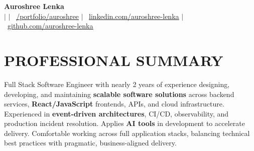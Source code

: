 \documentclass[a4paper,11pt]{article}
\begin{document}
\begin{center}
    \textbf{\Huge Auroshree Lenka} \\ \vspace{5pt}
    {\setlength{\baselineskip}{16pt}
    \small {} \hspace{1pt} $|$
    \hspace{1pt} \faEnvelope \hspace{2pt}{auroshreelenka@gmail.com} \hspace{1pt} $|$ 
    \hspace{1pt} \faGlobe~\href{https://auroshree-lenka.vercel.app}{\underline{/portfolio/auroshree}} \hspace{1pt} $|$
    \hspace{1pt} \faLinkedin~\href{https://linkedin.com/in/auroshree-lenka}{\underline{linkedin.com/auroshree-lenka}} $|$
    \hspace{1pt} \faGithub~\href{https://github.com/Alexwolf21}{\underline{github.com/auroshree-lenka}}
    }
    \\ \vspace{-3pt}
\end{center}

\section{PROFESSIONAL SUMMARY}
 Full Stack Software Engineer with nearly 2 years of experience designing, developing, and maintaining \textbf{scalable software solutions} across backend services, \textbf{React/JavaScript} frontends, APIs, and cloud infrastructure. Experienced in \textbf{event-driven architectures}, CI/CD, observability, and production incident resolution. Applies \textbf{AI tools} in development to accelerate delivery. Comfortable working across full application stacks, balancing technical best practices with pragmatic, business-aligned delivery.

\end{document}
